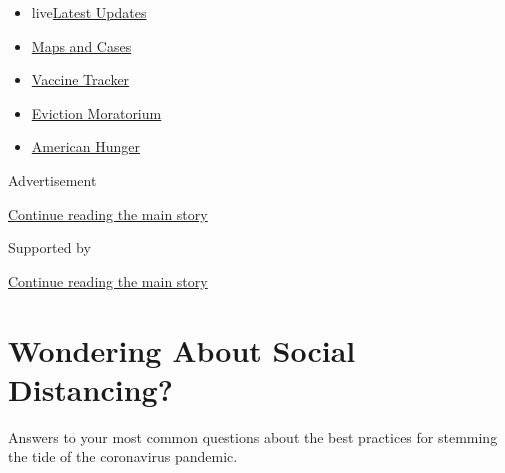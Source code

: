 \begin{itemize}
\tightlist
\item
  live\href{https://www.nytimes3xbfgragh.onion/2020/09/05/world/coronavirus-covid.html?name=styln-coronavirus-national\&region=TOP_BANNER\&block=storyline_menu_recirc\&action=click\&pgtype=Article\&impression_id=912db9f1-efba-11ea-9307-2f39405dea1d\&variant=undefined}{Latest
  Updates}
\item
  \href{https://www.nytimes3xbfgragh.onion/interactive/2020/us/coronavirus-us-cases.html?name=styln-coronavirus-national\&region=TOP_BANNER\&block=storyline_menu_recirc\&action=click\&pgtype=Article\&impression_id=912db9f2-efba-11ea-9307-2f39405dea1d\&variant=undefined}{Maps
  and Cases}
\item
  \href{https://www.nytimes3xbfgragh.onion/interactive/2020/science/coronavirus-vaccine-tracker.html?name=styln-coronavirus-national\&region=TOP_BANNER\&block=storyline_menu_recirc\&action=click\&pgtype=Article\&impression_id=912db9f3-efba-11ea-9307-2f39405dea1d\&variant=undefined}{Vaccine
  Tracker}
\item
  \href{https://www.nytimes3xbfgragh.onion/2020/09/02/your-money/eviction-moratorium-covid.html?name=styln-coronavirus-national\&region=TOP_BANNER\&block=storyline_menu_recirc\&action=click\&pgtype=Article\&impression_id=912de100-efba-11ea-9307-2f39405dea1d\&variant=undefined}{Eviction
  Moratorium}
\item
  \href{https://www.nytimes3xbfgragh.onion/interactive/2020/09/02/magazine/food-insecurity-hunger-us.html?name=styln-coronavirus-national\&region=TOP_BANNER\&block=storyline_menu_recirc\&action=click\&pgtype=Article\&impression_id=912de101-efba-11ea-9307-2f39405dea1d\&variant=undefined}{American
  Hunger}
\end{itemize}

Advertisement

\protect\hyperlink{after-top}{Continue reading the main story}

Supported by

\protect\hyperlink{after-sponsor}{Continue reading the main story}

\hypertarget{wondering-about-social-distancing}{%
\section{Wondering About Social
Distancing?}\label{wondering-about-social-distancing}}

Answers to your most common questions about the best practices for
stemming the tide of the coronavirus pandemic.


